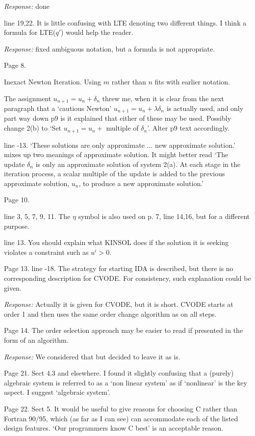 {\em Response:} done

line 19,22. It is little confusing with LTE denoting two different things. 
I think a formula for LTE($q'$) would help the reader. 

{\em Response:} fixed ambiguous notation, but a formula is not appropriate.
 
Page 8.

Inexact Newton Iteration. Using $m$ rather than $n$ fits with earlier
notation.

The assignment $u_{n+1} = u_n + \delta_n$ threw me, when it is clear
from the next paragraph that a `cautious Newton' $u_{n+1} = u_n +
\lambda\delta_n$ is actually used, and only part way down p9 is it
explained that either of these may be used. Possibly change 2(b) to
`Set $u_{n+1} = u_n + $ multiple of $\delta_n$'. Alter p9 text accordingly.

line -13. `These solutions are only approximate ... new approximate
solution.'  mixes up two meanings of approximate solution. It might
better read `The update $\delta_n$ is only an approximate solution of
system 2(a). At each stage in the iteration process, a scalar multiple
of the update is added to the previous approximate solution, $u_n$, to
produce a new approximate solution.'
 
Page 10.  

line 3, 5, 7, 9, 11. The $\eta$ symbol is also used on p. 7, line
14,16, but for a different purpose.

line 13. You should explain what KINSOL does if the solution it is
seeking violates a constraint such as $u^i > 0$.
 
Page 13.
line -18. The strategy for starting IDA is described, but there is no
corresponding description for CVODE. For consistency, such explanation
could be given.

{\em Response:} Actually it is given for CVODE, but it is short.
CVODE starts at order 1 and then uses the same order change algorithm
as on all steps.

Page 14. The order selection approach may be easier to read if
presented in the form of an algorithm.

{\em Response:} We considered that but decided to leave it as is.
 
Page 21. Sect 4.3 and elsewhere. I found it slightly confusing that a
(purely) algebraic system is referred to as a `non linear system' as
if `nonlinear' is the key aspect.  I suggest `algebraic system'.

Page 22. Sect 5. It would be useful to give reasons for choosing C
rather than Fortran 90/95, which (as far as I can see) can accommodate
each of the listed design features.  `Our programmers know C best' is
an acceptable reason.

